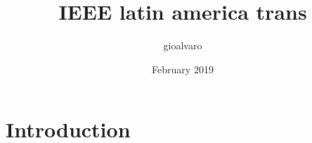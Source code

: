 \documentclass{article}
\title{IEEE latin america trans}
\author{gioalvaro }
\date{February 2019}
\begin{document}
\maketitle

\section{Introduction}
\end{document}
